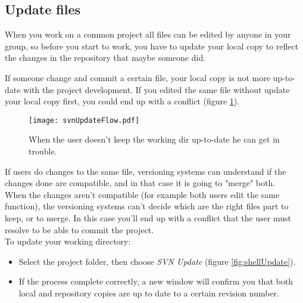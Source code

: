 \newpage









\subsection{Update files}
\label{subsection:UpdateFiles}

When you work on a common project all files can be edited by anyone in your group, so before you start to work, you have to update your local copy to reflect the changes in the repository that maybe someone did.

If someone change and commit a certain file, your local copy is not more up-to-date with the project development. If you edited the same file without update your local copy first, you could end up with a conflict (figure \ref{fig:svnUpdateFlow}).\\


\begin{figure}[htbp]
    \centering
    \texttt{[image: svnUpdateFlow.pdf]}
    \caption{When the user doesn't keep the working dir up-to-date he can get in trouble.}
    \label{fig:svnUpdateFlow}
\end{figure}


If users do changes to the same file, versioning systems can understand if the changes done are compatible, and in that case it is going to "merge" both.\\




When the changes aren't compatible (for example both users edit the same function), the versioning systems can't decide which are the right files part to keep, or to merge. In this case you'll end up with a conflict that the user must resolve to be able to commit the project.\\




To update your working directory:

\begin{itemize}

    \item Select the project folder, then choose \textit{SVN Update} (figure \ref{fig:shellUpdate}).
    
    \item If the process complete correctly, a new window will confirm you that both local and repository copies are up to date to a certain revision number.

\end{itemize}




